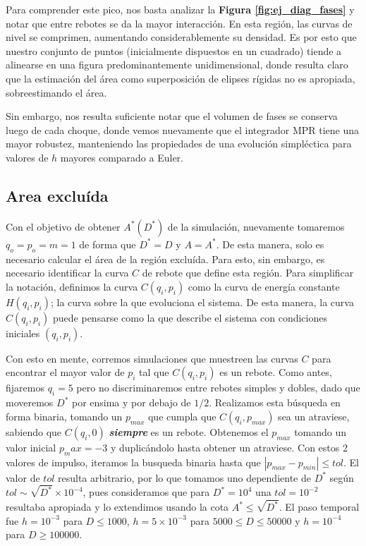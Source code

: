 Para comprender este pico, nos basta analizar la \textbf{Figura \ref{fig:ej_diag_fases}} y notar que entre rebotes se da la mayor interacción.
En esta región, las curvas de nivel se comprimen, aumentando considerablemente su densidad.
Es por esto que nuestro conjunto de puntos (inicialmente dispuestos en un cuadrado) tiende a alinearse en una figura predominantemente unidimensional, donde resulta claro que la estimación del área
como superposición de elipses rígidas no es apropiada, sobreestimando el área.

Sin embargo, nos resulta suficiente notar que el volumen de fases se conserva luego de cada choque, donde vemos nuevamente que el integrador MPR tiene una mayor robustez,
manteniendo las propiedades de una evolución simpléctica para valores de $h$ mayores comparado a Euler.


\subsection{Area excluída}{\label{sec:area_ex_comp}}

Con el objetivo de obtener $A^*(D^*)$ de la simulación, nuevamente tomaremos $q_o = p_o = m = 1$ de forma que $D^* = D$ y $A=A^*$.
De esta manera, solo es necesario calcular el área de la región excluída.
Para esto, sin embargo, es necesario identificar la curva $C$ de rebote que define esta región.
Para simplificar la notación, definimos la curva $C(q_i,p_i)$ como la curva de energía constante $H(q_i,p_i)$; la curva sobre la que evoluciona el sistema.
De esta manera, la curva $C(q_i,p_i)$ puede pensarse como la que describe el sistema con condiciones iniciales $(q_i,p_i)$.

Con esto en mente, corremos simulaciones que muestreen las curvas $C$ para encontrar el mayor valor de $p_i$ tal que $C(q_i, p_i)$ es un rebote.
Como antes, fijaremos $q_i=5$ pero no discriminaremos entre rebotes simples y dobles, dado que moveremos $D^*$ por ensima y por debajo de $1/2$.
Realizamos esta búsqueda en forma binaria, tomando un $p_{max}$ que cumpla que $C(q_i, p_{max})$ sea un atraviese, sabiendo que $C(q_i, 0)$ \textbf{\textit{siempre}} es un rebote.
Obtenemos el $p_{max}$ tomando un valor inicial $p_max = -3$ y duplicándolo hasta obtener un atraviese.
Con estos 2 valores de impulso, iteramos la busqueda binaria hasta que $|p_{max}-p_{min}|\leq tol$.
El valor de $tol$ resulta arbitrario, por lo que tomamos uno dependiente de $D^*$ según $tol \sim \sqrt{D^*}\times 10^{-4}$, pues consideramos que para $D^*=10^4$
una $tol = 10^{-2}$ resultaba apropiada y lo extendimos usando la cota $A^*\leq \sqrt{D^*}$.
El paso temporal fue $h=10^{-3}$ para $D\leq 1000$, $h=5\times10^{-3}$ para $5000\leq D\leq 50000$ y $h=10^{-4}$ para $D\geq 100000$.

